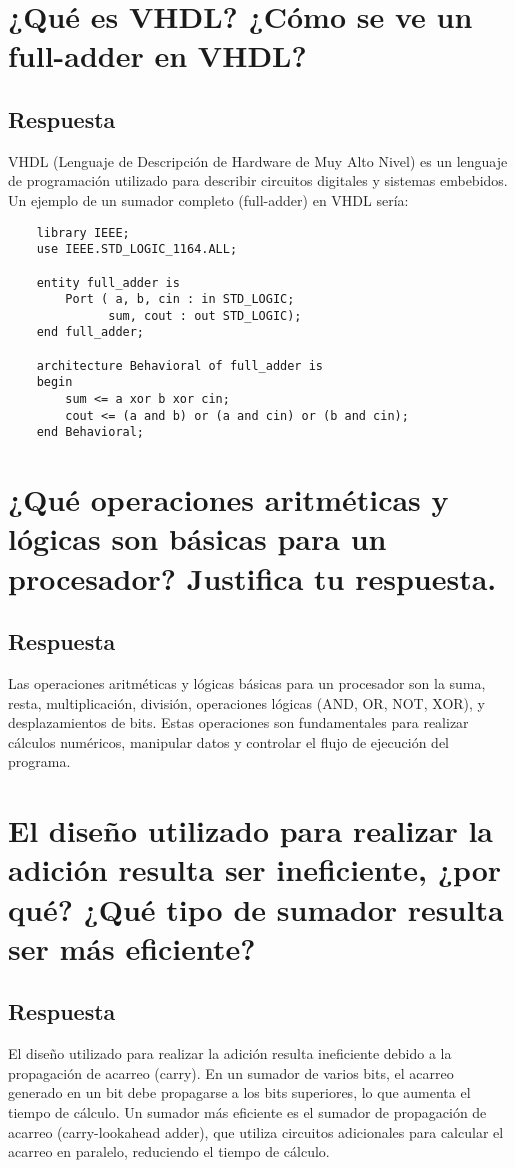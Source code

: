 \documentclass{article}
\begin{document}
    \section{¿Qué es VHDL? ¿Cómo se ve un full-adder en VHDL?}
    \subsection*{Respuesta}
    \item VHDL (Lenguaje de Descripción de Hardware de Muy Alto Nivel) es un lenguaje de programación utilizado para describir circuitos digitales y sistemas embebidos. Un ejemplo de un sumador completo (full-adder) en VHDL sería:

    \begin{verbatim}
    library IEEE;
    use IEEE.STD_LOGIC_1164.ALL;

    entity full_adder is
        Port ( a, b, cin : in STD_LOGIC;
              sum, cout : out STD_LOGIC);
    end full_adder;

    architecture Behavioral of full_adder is
    begin
        sum <= a xor b xor cin;
        cout <= (a and b) or (a and cin) or (b and cin);
    end Behavioral;
    \end{verbatim}

    \section{¿Qué operaciones aritméticas y lógicas son básicas para un procesador? Justifica tu respuesta.}
    \subsection*{Respuesta}
    \item Las operaciones aritméticas y lógicas básicas para un procesador son la suma, resta, multiplicación, división, operaciones lógicas (AND, OR, NOT, XOR), y desplazamientos de bits. Estas operaciones son fundamentales para realizar cálculos numéricos, manipular datos y controlar el flujo de ejecución del programa.


    \section{El diseño utilizado para realizar la adición resulta ser ineficiente, ¿por qué? ¿Qué tipo de sumador resulta ser más eficiente?}
    \subsection*{Respuesta}
    \item El diseño utilizado para realizar la adición resulta ineficiente debido a la propagación de acarreo (carry). En un sumador de varios bits, el acarreo generado en un bit debe propagarse a los bits superiores, lo que aumenta el tiempo de cálculo. Un sumador más eficiente es el sumador de propagación de acarreo (carry-lookahead adder), que utiliza circuitos adicionales para calcular el acarreo en paralelo, reduciendo el tiempo de cálculo.
\end{document}
